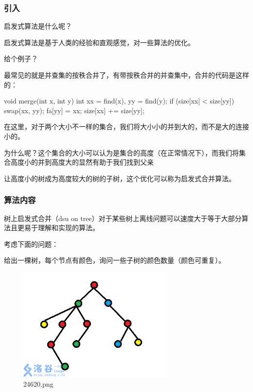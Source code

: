 
\subsubsection{引入}

启发式算法是什么呢？

启发式算法是基于人类的经验和直观感觉，对一些算法的优化。

给个例子？

最常见的就是并查集的按秩合并了，有带按秩合并的并查集中，合并的代码是这样的：

\begin{cppcode}
void merge(int x, int y) {
  int xx = find(x), yy = find(y);
  if (size[xx] < size[yy]) swap(xx, yy);
  fa[yy] = xx;
  size[xx] += size[yy];
}
\end{cppcode}

在这里，对于两个大小不一样的集合，我们将大小小的并到大的，而不是大的连接小的。

为什么呢？这个集合的大小可以认为是集合的高度（在正常情况下），而我们将集合高度小的并到高度大的显然有助于我们找到父亲

让高度小的树成为高度较大的树的子树，这个优化可以称为启发式合并算法。

\subsubsection{算法内容}

树上启发式合并（dsu on tree）对于某些树上离线问题可以速度大于等于大部分算法且更易于理解和实现的算法。

考虑下面的问题：

给出一棵树，每个节点有颜色，询问一些子树的颜色数量（颜色可重复）。

\begin{figure}[htbp]
\centering
\includegraphics[width=0.7\textwidth]{docs/misc/images/24620.png} 
\caption{24620.png}
\end{figure}   

